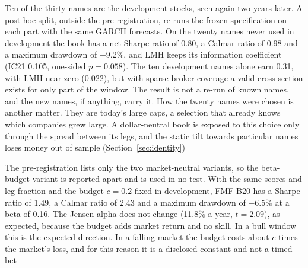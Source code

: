  Ten of the thirty names are the development stocks, seen again two years later. A post-hoc split, outside the pre-registration, re-runs the frozen specification on each part with the same GARCH forecasts. On the twenty names never used in development the book has a net Sharpe ratio of 0.80, a Calmar ratio of 0.98 and a maximum drawdown of $-9.2\%$, and LMH keeps its information coefficient (IC21 0.105, one-sided $p = 0.058$). The ten development names alone earn 0.31, with LMH near zero (0.022), but with sparse broker coverage a valid cross-section exists for only part of the window. The result is not a re-run of known names, and the new names, if anything, carry it. How the twenty names were chosen is another matter. They are today's large caps, a selection that already knows which companies grew large. A dollar-neutral book is exposed to this choice only through the spread between its legs, and the static tilt towards particular names loses money out of sample (Section~\ref{sec:identity})

 The pre-registration lists only the two market-neutral variants, so the beta-budget variant is reported apart and is used in no test. With the same scores and leg fraction and the budget $c=0.2$ fixed in development, FMF-B20 has a Sharpe ratio of 1.49, a Calmar ratio of 2.43 and a maximum drawdown of $-6.5\%$ at a beta of 0.16. The Jensen alpha does not change (11.8\% a year, $t = 2.09$), as expected, because the budget adds market return and no skill. In a bull window this is the expected direction. In a falling market the budget costs about $c$ times the market's loss, and for this reason it is a disclosed constant and not a timed bet
